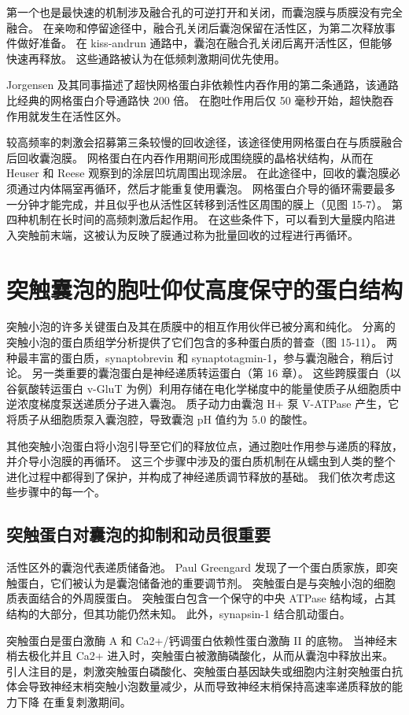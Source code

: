 第一个也是最快速的机制涉及融合孔的可逆打开和关闭，而囊泡膜与质膜没有完全融合。 在亲吻和停留途径中，融合孔关闭后囊泡保留在活性区，为第二次释放事件做好准备。 在 kiss-andrun 通路中，囊泡在融合孔关闭后离开活性区，但能够快速再释放。 这些通路被认为在低频刺激期间优先使用。

Jorgensen 及其同事描述了超快网格蛋白非依赖性内吞作用的第二条通路，该通路比经典的网格蛋白介导通路快 200 倍。 在胞吐作用后仅 50 毫秒开始，超快胞吞作用就发生在活性区外。

较高频率的刺激会招募第三条较慢的回收途径，该途径使用网格蛋白在与质膜融合后回收囊泡膜。 网格蛋白在内吞作用期间形成围绕膜的晶格状结构，从而在 Heuser 和 Reese 观察到的涂层凹坑周围出现涂层。 在此途径中，回收的囊泡膜必须通过内体隔室再循环，然后才能重复使用囊泡。 网格蛋白介导的循环需要最多一分钟才能完成，并且似乎也从活性区转移到活性区周围的膜上（见图 15-7）。 第四种机制在长时间的高频刺激后起作用。 在这些条件下，可以看到大量膜内陷进入突触前末端，这被认为反映了膜通过称为批量回收的过程进行再循环。

\section{突触囊泡的胞吐仰仗高度保守的蛋白结构}
突触小泡的许多关键蛋白及其在质膜中的相互作用伙伴已被分离和纯化。 分离的突触小泡的蛋白质组学分析提供了它们包含的多种蛋白质的普查（图 15-11）。 两种最丰富的蛋白质，synaptobrevin 和 synaptotagmin-1，参与囊泡融合，稍后讨论。 另一类重要的囊泡蛋白是神经递质转运蛋白（第 16 章）。 这些跨膜蛋白（以谷氨酸转运蛋白 v-GluT 为例）利用存储在电化学梯度中的能量使质子从细胞质中逆浓度梯度泵送递质分子进入囊泡。 质子动力由囊泡 H+ 泵 V-ATPase 产生，它将质子从细胞质泵入囊泡腔，导致囊泡 pH 值约为 5.0 的酸性。

其他突触小泡蛋白将小泡引导至它们的释放位点，通过胞吐作用参与递质的释放，并介导小泡膜的再循环。 这三个步骤中涉及的蛋白质机制在从蠕虫到人类的整个进化过程中都得到了保护，并构成了神经递质调节释放的基础。 我们依次考虑这些步骤中的每一个。


\subsection{突触蛋白对囊泡的抑制和动员很重要}
活性区外的囊泡代表递质储备池。 Paul Greengard 发现了一个蛋白质家族，即突触蛋白，它们被认为是囊泡储备池的重要调节剂。 突触蛋白是与突触小泡的细胞质表面结合的外周膜蛋白。 突触蛋白包含一个保守的中央 ATPase 结构域，占其结构的大部分，但其功能仍然未知。 此外，synapsin-1 结合肌动蛋白。

突触蛋白是蛋白激酶 A 和 Ca2+/钙调蛋白依赖性蛋白激酶 II 的底物。 当神经末梢去极化并且 Ca2+ 进入时，突触蛋白被激酶磷酸化，从而从囊泡中释放出来。 引人注目的是，刺激突触蛋白磷酸化、突触蛋白基因缺失或细胞内注射突触蛋白抗体会导致神经末梢突触小泡数量减少，从而导致神经末梢保持高速率递质释放的能力下降 在重复刺激期间。


